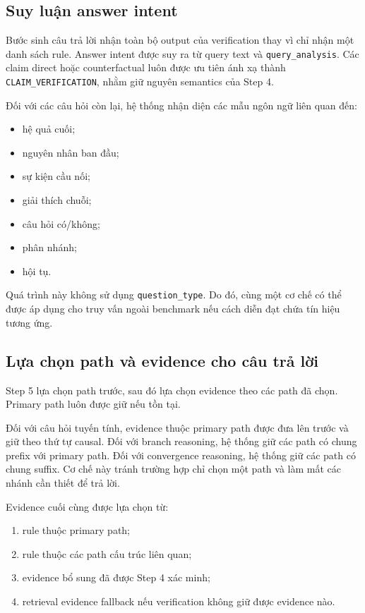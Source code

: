 \subsection{Suy luận answer intent}

Bước sinh câu trả lời nhận toàn bộ output của verification thay vì chỉ nhận
một danh sách rule. Answer intent được suy ra từ query text và
\texttt{query\_analysis}. Các claim direct hoặc counterfactual luôn được ưu
tiên ánh xạ thành \texttt{CLAIM\_VERIFICATION}, nhằm giữ nguyên semantics của
Step 4.

Đối với các câu hỏi còn lại, hệ thống nhận diện các mẫu ngôn ngữ liên quan
đến:

\begin{itemize}
    \item hệ quả cuối;
    \item nguyên nhân ban đầu;
    \item sự kiện cầu nối;
    \item giải thích chuỗi;
    \item câu hỏi có/không;
    \item phân nhánh;
    \item hội tụ.
\end{itemize}

Quá trình này không sử dụng \texttt{question\_type}. Do đó, cùng một cơ chế
có thể được áp dụng cho truy vấn ngoài benchmark nếu cách diễn đạt chứa tín
hiệu tương ứng.

\subsection{Lựa chọn path và evidence cho câu trả lời}

Step 5 lựa chọn path trước, sau đó lựa chọn evidence theo các path đã chọn.
Primary path luôn được giữ nếu tồn tại.

Đối với câu hỏi tuyến tính, evidence thuộc primary path được đưa lên trước
và giữ theo thứ tự causal. Đối với branch reasoning, hệ thống giữ các path
có chung prefix với primary path. Đối với convergence reasoning, hệ thống
giữ các path có chung suffix. Cơ chế này tránh trường hợp chỉ chọn một path
và làm mất các nhánh cần thiết để trả lời.

Evidence cuối cùng được lựa chọn từ:

\begin{enumerate}
    \item rule thuộc primary path;
    \item rule thuộc các path cấu trúc liên quan;
    \item evidence bổ sung đã được Step 4 xác minh;
    \item retrieval evidence fallback nếu verification không giữ được
    evidence nào.
\end{enumerate}

